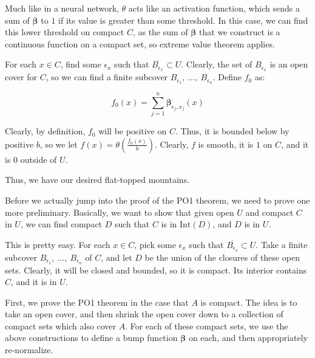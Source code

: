 \documentclass[10pt, oneside]{amsart}
\newcommand{\bm}{\boldsymbol}
\begin{document}
\begin{enumerate}
      Much like in a neural network, $\theta$ acts like an activation function, which sends a sum of $\bm{\beta}$ to $1$ if its value is greater than some threshold. In this case, we can find this lower threshold on compact $C$, as the sum of $\bm{\beta}$ that we
      construct is a continuous function on a compact set, so extreme value theorem applies.
      \newline

      For each $x \in C$, find some $\epsilon_x$ such that $\overline{B_{\epsilon_x}} \subset U$. Clearly, the set of $B_{\epsilon_x}$ is an open
      cover for $C$, so we can find a finite subcover $B_{\epsilon_1}, \ ..., \ B_{\epsilon_n}$. Define $f_0$ as:

      $$f_0(x) = \displaystyle\sum_{j = 1}^{n} \bm{\beta}_{\epsilon_j, x_j}(x)$$

      Clearly, by definition, $f_0$ will be positive on $C$. Thus, it is bounded below by positive $b$, so we let $f(x) = \theta \left( \frac{f_0(x)}{b} \right)$. Clearly, $f$ is smooth, it is $1$ on $C$, and it is $0$ outside of $U$.
      \newline

      Thus, we have our desired flat-topped mountains.
    \end{enumerate}

    \hrulefill

    Before we actually jump into the proof of the PO1 theorem, we need to prove one more preliminary. Basically, we want to show that
    given open $U$ and compact $C$ in $U$, we can find compact $D$ such that $C$ is in $\text{Int}(D)$, and $D$ is in $U$.
    \newline

    This is pretty easy. For each $x \in C$, pick some $\epsilon_x$ such that $\overline{B_{\epsilon_x}} \subset U$. Take a finite subcover $B_{\epsilon_1}, \ ..., \ B_{\epsilon_n}$ of $C$, and let $D$ be the union of the closures of these open sets. Clearly, it will be closed and bounded, so it is compact. Its interior contains $C$, and it is in $U$.

    \hrulefill

    First, we prove the PO1 theorem in the case that $A$ is compact. The idea is to take an open cover, and then shrink the open cover down to a collection of compact sets which also cover $A$. For each of these compact sets, we use the above constructions to define a bump function $\bm{\beta}$ on each, and then appropriately re-normalize.
    \newline
\end{document}
